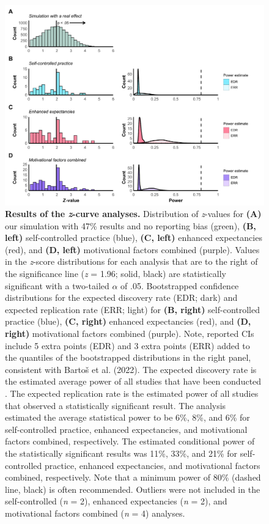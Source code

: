 \documentclass[
  man, donotrepeattitle,floatsintext]{apa7}
\begin{document}
\clearpage

\begin{figure}

{\centering \includegraphics{../../figs/fig3} 

}

\caption{\linespread{0.96}\normalfont\footnotesize\textbf{Results of the \emph{z}-curve analyses.} Distribution of \emph{z}-values for \textbf{(A)} our simulation with 47\% results and no reporting bias (green), \textbf{(B, left)} self-controlled practice (blue), \textbf{(C, left)} enhanced expectancies (red), and \textbf{(D, left)} motivational factors combined (purple). Values in the \emph{z}-score distributions for each analysis that are to the right of the significance line (\emph{z} = 1.96; solid, black) are statistically significant with a two-tailed \(\alpha\) of .05. Bootstrapped confidence distributions for the expected discovery rate (EDR; dark) and expected replication rate (ERR; light) for \textbf{(B, right)} self-controlled practice (blue), \textbf{(C, right)} enhanced expectancies (red), and \textbf{(D, right)} motivational factors combined (purple). Note, reported CIs include 5 extra points (EDR) and 3 extra points (ERR) added to the quantiles of the bootstrapped distributions in the right panel, consistent with Bartoš et al. (2022). The expected discovery rate is the estimated average power of all studies that have been conducted . The expected replication rate is the estimated power of all studies that observed a statistically significant result. The analysis estimated the average statistical power to be 6\%, 8\%, and 6\% for self-controlled practice, enhanced expectancies, and motivational factors combined, respectively. The estimated conditional power of the statistically significant results was 11\%, 33\%, and 21\% for self-controlled practice, enhanced expectancies, and motivational factors combined, respectively. Note that a minimum power of 80\% (dashed line, black) is often recommended. Outliers were not included in the self-controlled (\emph{n} = 2), enhanced expectancies (\emph{n} = 2), and motivational factors combined (\emph{n} = 4) analyses.}\label{fig:fig3}
\end{figure}
\end{document}
